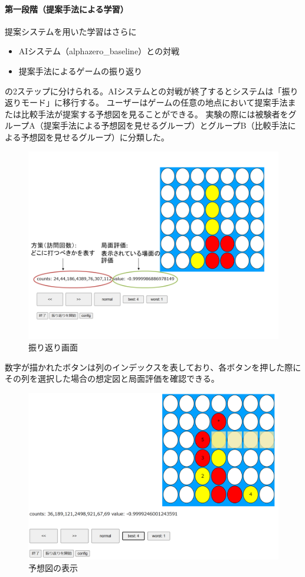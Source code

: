 \paragraph{第一段階（提案手法による学習）}
提案システムを用いた学習はさらに
\begin{itemize}
	\item AIシステム（alphazero\_baseline）との対戦
	\item 提案手法によるゲームの振り返り
\end{itemize}
の2ステップに分けられる。AIシステムとの対戦が終了するとシステムは「振り返りモード」に移行する。
ユーザーはゲームの任意の地点において提案手法または比較手法が提案する予想図を見ることができる。
実験の際には被験者をグループA（提案手法による予想図を見せるグループ）とグループB（比較手法による予想図を見せるグループ）に分類した。
\begin{figure}[t]
	\centering
	\includegraphics[width=\linewidth]{./figure/lookBack.png}
	\caption{振り返り画面}
	\label{fig:lookBack}
\end{figure}
数字が描かれたボタンは列のインデックスを表しており、各ボタンを押した際にその列を選択した場合の想定図と局面評価を確認できる。
\begin{figure}[t]
	\centering
	\includegraphics[width=\linewidth]{./figure/trajSystem.png}
	\caption{予想図の表示}
	\label{fig:trajSystem}
\end{figure}
